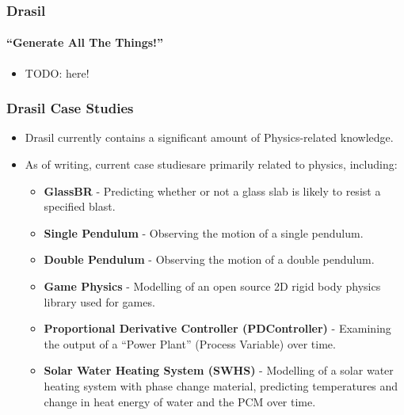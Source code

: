 \documentclass{beamer}
\begin{document}
\begin{frame}
\end{frame}

\begin{frame}
    \frametitle{Drasil}
    \framesubtitle{``Generate All The Things!''}
    
    \begin{itemize}
        \item TODO: here!
    \end{itemize}
\end{frame}

\begin{frame}
    \frametitle{Drasil Case Studies}
    \begin{itemize}
        \item<2-> Drasil currently contains a significant amount of Physics-related knowledge.
        \item<3-> As of writing, current case studies\footnotemark[1] are primarily related to physics, including:
            \begin{itemize}
                \item<4-> \textbf{GlassBR} - Predicting whether or not a glass slab is likely to resist a specified blast.
                \item<5-> \textbf{Single Pendulum} - Observing the motion of a single pendulum.
                \item<6-> \textbf{Double Pendulum} - Observing the motion of a double pendulum.
                \item<7-> \textbf{Game Physics} - Modelling of an open source 2D rigid body physics library used for games.
                \item<8-> \textbf{Proportional Derivative Controller (PDController)} - Examining the output of a ``Power Plant'' (Process Variable) over time.
                \item<9-> \textbf{Solar Water Heating System (SWHS)} - Modelling of a solar water heating system with phase change material, predicting temperatures and change in heat energy of water and the PCM over time.
            \end{itemize}
    \end{itemize}

\end{frame}
\end{document}
